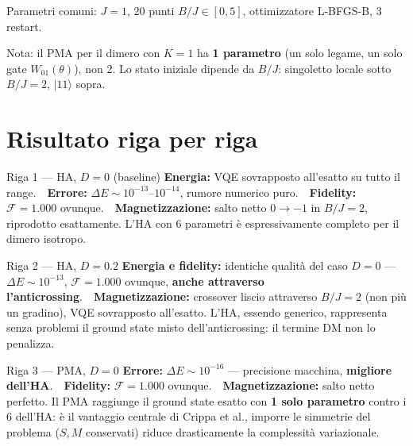 \documentclass[11pt,a4paper]{article}
\begin{document}
Parametri comuni: $J=1$, 20 punti $B/J\in[0,5]$, ottimizzatore
L-BFGS-B, 3 restart.

\begin{keyeq}
\small
Nota: il PMA per il dimero con $K=1$ ha \textbf{1 parametro} (un solo
legame, un solo gate $W_{01}(\theta)$), non 2. Lo stato iniziale dipende
da $B/J$: singoletto locale sotto $B/J=2$, $|11\rangle$ sopra.
\end{keyeq}

\section*{Risultato riga per riga}

\begin{okbox}{Riga 1 --- HA, $D=0$ (baseline)}
\textbf{Energia:} VQE sovrapposto all'esatto su tutto il range.\ \
\textbf{Errore:} $\Delta E\sim10^{-13}$--$10^{-14}$, rumore numerico
puro.\ \ \textbf{Fidelity:} $\mathcal F=1.000$ ovunque.\ \
\textbf{Magnetizzazione:} salto netto $0\to-1$ in $B/J=2$, riprodotto
esattamente. L'HA con 6 parametri è espressivamente completo per il
dimero isotropo.
\end{okbox}
\smallskip

\begin{okbox}{Riga 2 --- HA, $D=0.2$}
\textbf{Energia e fidelity:} identiche qualità del caso $D=0$ ---
$\Delta E\sim10^{-13}$, $\mathcal F=1.000$ ovunque, \textbf{anche
attraverso l'anticrossing}.\ \ \textbf{Magnetizzazione:} crossover
liscio attraverso $B/J=2$ (non più un gradino), VQE sovrapposto
all'esatto. L'HA, essendo generico, rappresenta senza problemi il
ground state misto dell'anticrossing: il termine DM non lo penalizza.
\end{okbox}
\smallskip

\begin{okbox}{Riga 3 --- PMA, $D=0$}
\textbf{Errore:} $\Delta E\sim10^{-16}$ --- precisione macchina,
\textbf{migliore dell'HA}.\ \ \textbf{Fidelity:} $\mathcal F=1.000$
ovunque.\ \ \textbf{Magnetizzazione:} salto netto perfetto. Il PMA
raggiunge il ground state esatto con \textbf{1 solo parametro} contro i
6 dell'HA: è il vantaggio centrale di Crippa et al., imporre le
simmetrie del problema ($S,M$ conservati) riduce drasticamente la
complessità variazionale.
\end{okbox}
\smallskip
\end{document}
